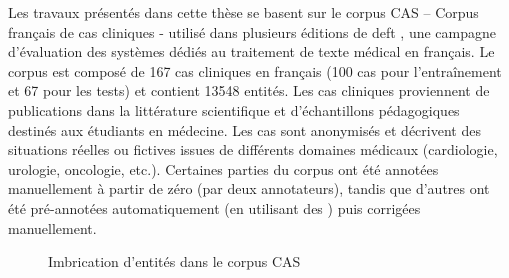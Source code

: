 Les travaux présentés dans cette thèse se basent sur le corpus CAS -- Corpus français de cas cliniques \cite{grabarCASFrenchCorpus2018} - utilisé dans plusieurs éditions de \gls{deft} \cite{cardonPresentationCampagneEvaluation2020,grouinClassificationCasCliniques2021}, une campagne d'évaluation des systèmes dédiés au traitement de texte médical en français.
Le corpus est composé de \num{167} cas cliniques en français (\num{100} cas pour l'entraînement et \num{67} pour les tests) et contient \num{13548} entités.
Les cas cliniques proviennent de publications dans la littérature scientifique et d'échantillons pédagogiques destinés aux étudiants en médecine.
Les cas sont anonymisés et décrivent des situations réelles ou fictives issues de différents domaines médicaux (cardiologie, urologie, oncologie, etc.).
Certaines parties du corpus ont été annotées manuellement à partir de zéro (par deux annotateurs), tandis que d'autres ont été pré-annotées automatiquement (en utilisant des ) puis corrigées manuellement.

\begin{figure}[htb]
    \centering
    \begin{adjustbox}{max width=\linewidth}
    \end{adjustbox}
    \caption{Imbrication d'entités dans le corpus CAS}
    \label{fig:tal:nested-ents}
\end{figure}

